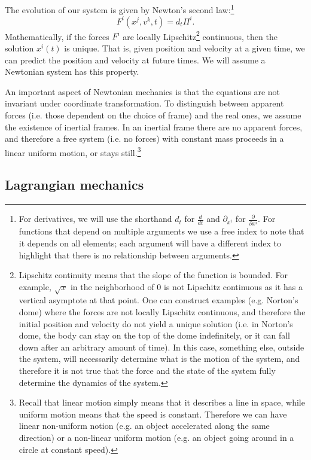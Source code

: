 The evolution of our system is given by Newton's second law:\footnote{For derivatives, we will use the shorthand $d_t$ for $\frac{d}{dt}$ and $\partial_{x^i}$ for $\frac{\partial}{\partial x^i}$. For functions that depend on multiple arguments we use a free index to note that it depends on all elements; each argument will have a different index to highlight that there is no relationship between arguments. }
\begin{equation}\label{rp-cm-NewtonsSecondLaw}
	F^i(x^j, v^k, t) = d_t \Pi^i.
\end{equation}
Mathematically, if the forces $F^i$ are locally Lipschitz\footnote{Lipschitz continuity means that the slope of the function is bounded. For example, $\sqrt{x}$ in the neighborhood of $0$ is not Lipschitz continuous as it has a vertical asymptote at that point. One can construct examples (e.g. Norton's dome) where the forces are not locally Lipschitz continuous, and therefore the initial position and velocity do not yield a unique solution (i.e. in Norton's dome, the body can stay on the top of the dome indefinitely, or it can fall down after an arbitrary amount of time). In this case, something else, outside the system, will necessarily determine what is the motion of the system, and therefore it is not true that the force and the state of the system fully determine the dynamics of the system.} continuous, then the solution $x^i(t)$ is unique. That is, given position and velocity at a given time, we can predict the position and velocity at future times. We will assume a Newtonian system has this property.

An important aspect of Newtonian mechanics is that the equations are not invariant under coordinate transformation. To distinguish between apparent forces (i.e. those dependent on the choice of frame) and the real ones, we assume the existence of inertial frames. In an inertial frame there are no apparent forces, and therefore a free system (i.e. no forces) with constant mass proceeds in a linear uniform motion, or stays still.\footnote{Recall that linear motion simply means that it describes a line in space, while uniform motion means that the speed is constant. Therefore we can have linear non-uniform notion (e.g. an object accelerated along the same direction) or a non-linear uniform motion (e.g. an object going around in a circle at constant speed).}

\subsection{Lagrangian mechanics}

